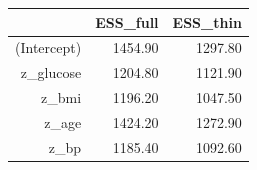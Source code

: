 \begin{table}[ht]
\centering
\begin{tabular}{rrr}
  \hline
 & ESS\_full & ESS\_thin \\ 
  \hline
(Intercept) & 1454.90 & 1297.80 \\ 
  z\_glucose & 1204.80 & 1121.90 \\ 
  z\_bmi & 1196.20 & 1047.50 \\ 
  z\_age & 1424.20 & 1272.90 \\ 
  z\_bp & 1185.40 & 1092.60 \\ 
   \hline
\end{tabular}
\end{table}

